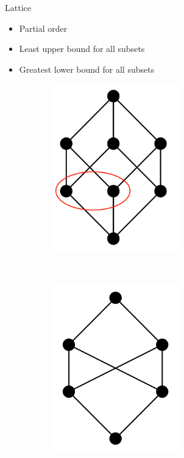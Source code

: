 \begin{frame}{Lattice}
  \begin{itemize}
  \item Partial order 
  \item Least upper bound for all subsets
  \item Greatest lower bound for all subsets
  \end{itemize}


  \begin{figure}
    \begin{subfigure}[b]{0.4\textwidth}
      \includegraphics[width=0.6\textwidth]{graphics/lattice_low}
    \end{subfigure}
    ~
    \begin{subfigure}[b]{0.4\textwidth}
      \includegraphics[width=0.6\textwidth]{graphics/notlattice}
    \end{subfigure}    
  \end{figure}
\end{frame}

